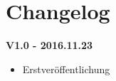 \chapter{Changelog}
\large\textbf{V1.0 - 2016.11.23}\\[-1.5em]
\begin{itemize}
\item Erstveröffentlichung
\end{itemize}
